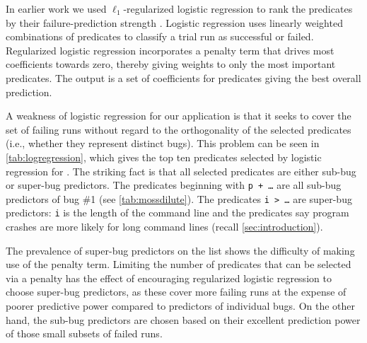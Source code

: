 In earlier work
we used $\ell_1$-regularized logistic regression
to rank the predicates by their
failure-prediction strength \cite{PLDI`03*141,NIPS2003_AP05}.
Logistic regression uses linearly weighted
combinations of predicates to classify a trial run as successful or
failed.  Regularized logistic regression incorporates a penalty
term that drives most coefficients towards zero, thereby
giving weights to only the most important predicates.  The output
is a set of coefficients for predicates giving the best overall prediction.

A weakness of logistic regression for our application is that it seeks
to cover the set of failing runs without regard to the orthogonality
of the selected predicates (i.e., whether they represent distinct
bugs).  This problem can be seen in \autoref{tab:logregression},
which gives the top ten predicates selected by logistic regression
for \moss.  The striking fact is that all selected predicates are
either sub-bug or super-bug predictors.  The predicates beginning with
\texttt{p + \ldots} are all sub-bug predictors of bug \#1 (see
\autoref{tab:mossdilute}).  The predicates \texttt{i > \ldots} are
super-bug predictors: \texttt{i} is the length of the command line and
the predicates say program crashes are more likely for long command
lines (recall \autoref{sec:introduction}).

The prevalence of super-bug predictors on the list shows the
difficulty of making use of the penalty term.  Limiting the number of
predicates that can be selected via a penalty has the effect of
encouraging regularized logistic regression to choose super-bug predictors, as
these cover more failing runs at the expense of poorer predictive
power compared to predictors of individual bugs.  On the other hand,
the sub-bug predictors are chosen based on their excellent prediction
power of those small subsets of failed runs.

